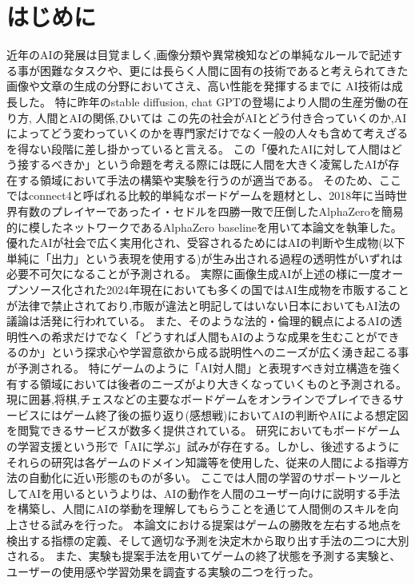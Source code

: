 \chapter{はじめに}
近年のAIの発展は目覚ましく,画像分類や異常検知などの単純なルールで記述する事が困難なタスクや、更には長らく人間に固有の技術であると考えられてきた画像や文章の生成\cite{oord2016wavenet}の分野においてさえ、高い性能を発揮するまでに
AI技術は成長した。
特に昨年のstable diffusion\cite{oord2016wavenet}, chat GPT\cite{oord2016wavenet}の登場により人間の生産労働の在り方, 人間とAIの関係,ひいては
この先の社会がAIとどう付き合っていくのか,AIによってどう変わっていくのかを専門家だけでなく一般の人々も含めて考えざるを得ない段階に差し掛かっていると言える。
この「優れたAIに対して人間はどう接するべきか」という命題を考える際には既に人間を大きく凌駕したAIが存在する領域において手法の構築や実験を行うのが適当である。
そのため、ここではconnect4と呼ばれる比較的単純なボードゲームを題材とし、2018年に当時世界有数のプレイヤーであったイ・セドルを四勝一敗で圧倒したAlphaZero\cite{oord2016wavenet}を簡易的に模したネットワークであるAlphaZero baseline\cite{oord2016wavenet}を用いて本論文を執筆した。
優れたAIが社会で広く実用化され、受容されるためにはAIの判断や生成物(以下単純に「出力」という表現を使用する)が生み出される過程の透明性がいずれは必要不可欠になることが予測される。
実際に画像生成AIが上述の様に一度オープンソース化された2024年現在においても多くの国ではAI生成物を市販することが法律で禁止されており\cite{oord2016wavenet},市販が違法と明記してはいない日本においてもAI法の議論は活発に行われている。
また、そのような法的・倫理的観点によるAIの透明性への希求だけでなく「どうすれば人間もAIのような成果を生むことができるのか」という探求心や学習意欲から成る説明性へのニーズが広く湧き起こる事が予測される。
特にゲームのように「AI対人間」と表現すべき対立構造を強く有する領域においては後者のニーズがより大きくなっていくものと予測される。
現に囲碁,将棋,チェスなどの主要なボードゲームをオンラインでプレイできるサービスにはゲーム終了後の振り返り(感想戦)においてAIの判断やAIによる想定図を閲覧できるサービスが数多く提供されている。
研究においてもボードゲームの学習支援という形で「AIに学ぶ」試みが存在する。しかし、後述するようにそれらの研究は各ゲームのドメイン知識等を使用した、従来の人間による指導方法の自動化に近い形態のものが多い。
ここでは人間の学習のサポートツールとしてAIを用いるというよりは、AIの動作を人間のユーザー向けに説明する手法を構築し、人間にAIの挙動を理解してもらうことを通じて人間側のスキルを向上させる試みを行った。
本論文における提案はゲームの勝敗を左右する地点を検出する指標の定義、そして適切な予測を決定木から取り出す手法の二つに大別される。
また、実験も提案手法を用いてゲームの終了状態を予測する実験と、ユーザーの使用感や学習効果を調査する実験の二つを行った。